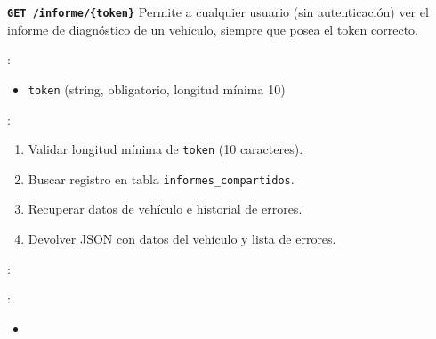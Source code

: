 \documentclass[a4paper,11pt,spanish]{sphinxmanual}
\newcommand{\robotoMonoBold}{\fontseries{b}\selectfont\ttfamily}
\renewcommand{\sphinxcode}[1]{\textcolor{sphinxorangeCode}{{\robotoMonoBold #1}}}
\renewcommand{\sphinxbfcode}[1]{\textbf{\sphinxcode{#1}}}
\renewcommand{\sphinxupquote}[1]{\texttt{#1}}
\begin{document}
\begin{fulllineitems}
\label{\detokenize{endpoints:get--informe-token}}
\pysigstartsignatures
\pysigline
{\sphinxbfcode{\sphinxupquote{GET~}}\sphinxbfcode{\sphinxupquote{/informe/\{token\}}}}
\pysigstopsignatures
\sphinxAtStartPar
Permite a cualquier usuario (sin autenticación) ver el informe de diagnóstico de un vehículo, siempre que posea el token correcto.

\sphinxAtStartPar
{}:
\begin{itemize}
\item {} 
\sphinxAtStartPar
\sphinxcode{\sphinxupquote{token}} (string, obligatorio, longitud mínima 10)

\end{itemize}

\sphinxAtStartPar
{}:
\begin{enumerate}
%
\item {} 
\sphinxAtStartPar
Validar longitud mínima de \sphinxcode{\sphinxupquote{token}} (10 caracteres).

\item {} 
\sphinxAtStartPar
Buscar registro en tabla \sphinxcode{\sphinxupquote{informes\_compartidos}}.

\item {} 
\sphinxAtStartPar
Recuperar datos de vehículo e historial de errores.

\item {} 
\sphinxAtStartPar
Devolver JSON con datos del vehículo y lista de errores.

\end{enumerate}

\sphinxAtStartPar
{}:

\begin{sphinxVerbatim}[commandchars=\\\{\}]
  
 
\end{sphinxVerbatim}

\sphinxAtStartPar
{}:
\begin{itemize}
\item {} 
\sphinxAtStartPar
{}


\end{itemize}
\end{fulllineitems}
\end{document}
